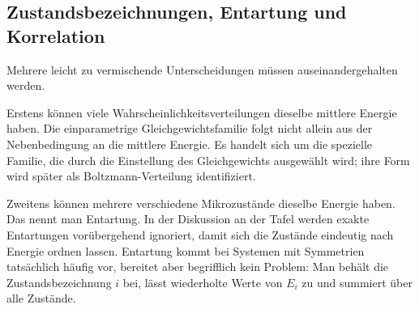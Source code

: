 \begin{classroomqa}
\end{classroomqa}

\begin{classroomqa}
\end{classroomqa}

\subsection{Zustandsbezeichnungen, Entartung und Korrelation}

Mehrere leicht zu vermischende Unterscheidungen müssen auseinandergehalten werden.

Erstens können viele Wahrscheinlichkeitsverteilungen dieselbe mittlere Energie haben. Die einparametrige Gleichgewichtsfamilie folgt nicht allein aus der Nebenbedingung an die mittlere Energie. Es handelt sich um die spezielle Familie, die durch die Einstellung des Gleichgewichts ausgewählt wird; ihre Form wird später als Boltzmann-Verteilung identifiziert.

Zweitens können mehrere verschiedene Mikrozustände dieselbe Energie haben. Das nennt man Entartung. In der Diskussion an der Tafel werden exakte Entartungen vorübergehend ignoriert, damit sich die Zustände eindeutig nach Energie ordnen lassen. Entartung kommt bei Systemen mit Symmetrien tatsächlich häufig vor, bereitet aber begrifflich kein Problem: Man behält die Zustandsbezeichnung \(i\) bei, lässt wiederholte Werte von \(E_i\) zu und summiert über alle Zustände.

